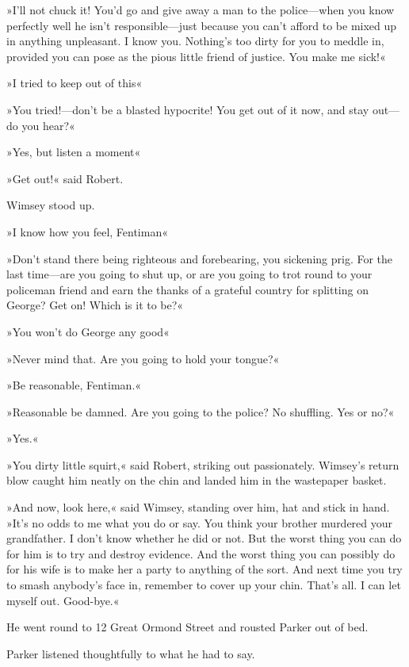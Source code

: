 »I'll not chuck it! You'd go and give away a man to the police\allowbreak---\allowbreak when you know perfectly well he isn't responsible\allowbreak---\allowbreak just because you can't afford to be mixed up in anything unpleasant. I know you. Nothing's too dirty for you to meddle in, provided you can pose as the pious little friend of justice. You make me sick!«

»I tried to keep out of this\longdash«

»You tried!---don't be a blasted hypocrite! You get out of it now, and stay out\allowbreak---\allowbreak do you hear?«

»Yes, but listen a moment\longdash«

»Get out!« said Robert.

Wimsey stood up.

»I know how you feel, Fentiman\longdash«

»Don't stand there being righteous and forebearing, you sickening prig. For the last time\allowbreak---\allowbreak are you going to shut up, or are you going to trot round to your policeman friend and earn the thanks of a grateful country for splitting on George? Get on! Which is it to be?«

»You won't do George any good\longdash«

»Never mind that. Are you going to hold your tongue?«

»Be reasonable, Fentiman.«

»Reasonable be damned. Are you going to the police? No shuffling. Yes or no?«

»Yes.«

»You dirty little squirt,« said Robert, striking out passionately. Wimsey's return blow caught him neatly on the chin and landed him in the wastepaper basket.

»And now, look here,« said Wimsey, standing over him, hat and stick in hand. »It's no odds to me what you do or say. You think your brother murdered your grandfather. I don't know whether he did or not. But the worst thing you can do for him is to try and destroy evidence. And the worst thing you can possibly do for his wife is to make her a party to anything of the sort. And next time you try to smash anybody's face in, remember to cover up your chin. That's all. I can let myself out. Good-bye.«

He went round to 12 Great Ormond Street and rousted Parker out of bed.

Parker listened thoughtfully to what he had to say.

